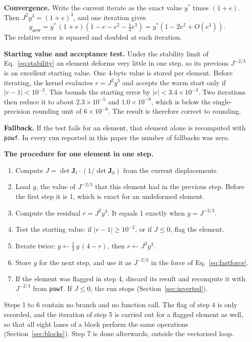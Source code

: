 \documentclass[11pt,a4paper]{article}
\newcommand{\code}[1]{\texttt{#1}}
\newcommand{\Jm}{J^{-2/3}}
\newcommand{\mat}[1]{\mathbf{#1}}
\begin{document}
\textbf{Convergence.} Write the current iterate as the exact value $y^{*}$ times $(1 + e)$. Then $J^2 y^3 = (1 + e)^3$, and one iteration gives
\begin{equation}
y_{\text{new}} = y^{*}\,(1+e)\left( 1 - e - e^2 - \tfrac{1}{3}e^3 \right) = y^{*}\left( 1 - 2e^2 + O(e^3) \right).
\end{equation}
The relative error is squared and doubled at each iteration.

\textbf{Starting value and acceptance test.} Under the stability limit of Eq.~\eqref{eq:stability} an element deforms very little in one step, so its previous $\Jm$ is an excellent starting value. One 4-byte value is stored per element. Before iterating, the kernel evaluates $r = J^2 y^3$ and accepts the warm start only if $|r - 1| < 10^{-2}$. This bounds the starting error by $|e| < 3.4\times10^{-3}$. Two iterations then reduce it to about $2.3\times10^{-5}$ and $1.0\times10^{-9}$, which is below the single-precision rounding unit of $6\times10^{-8}$. The result is therefore correct to rounding.

\textbf{Fallback.} If the test fails for an element, that element alone is recomputed with \code{powf}. In every run reported in this paper the number of fallbacks was zero.

\textbf{The procedure for one element in one step.}
\begin{enumerate}
\item Compute $J = \det\mat{J}_t \cdot (1/\det\mat{J}_0)$ from the current displacements.
\item Load $y$, the value of $\Jm$ that this element had in the previous step. Before the first step it is 1, which is exact for an undeformed element.
\item Compute the residual $r = J^2 y^3$. It equals 1 exactly when $y = \Jm$.
\item Test the starting value: if $|r - 1| \ge 10^{-2}$, or if $J \le 0$, flag the element.
\item Iterate twice: $y \leftarrow \tfrac{1}{3}\,y\,(4 - r)$, then $r \leftarrow J^2 y^3$.
\item Store $y$ for the next step, and use it as $\Jm$ in the force of Eq.~\eqref{eq:fastforce}.
\item If the element was flagged in step 4, discard its result and recompute it with $\Jm$ from \code{powf}. If $J \le 0$, the run stops (Section~\ref{sec:inverted}).
\end{enumerate}
Steps 1 to 6 contain no branch and no function call. The flag of step 4 is only recorded, and the iteration of step 5 is carried out for a flagged element as well, so that all eight lanes of a block perform the same operations (Section~\ref{sec:blocks}). Step 7 is done afterwards, outside the vectorised loop.
\end{document}
